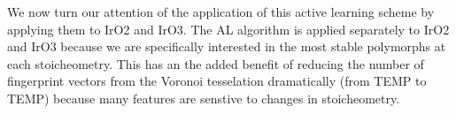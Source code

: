 


%
%
We now turn our attention of the application of this active learning scheme by
applying them to IrO2 and IrO3.
%
The AL algorithm is applied separately to IrO2 and IrO3 because we are specifically interested in the most stable polymorphs at each stoicheometry.
This has an the added benefit of reducing the number of fingerprint vectors from the Voronoi tesselation dramatically (from TEMP to TEMP) because many features are senstive to changes in stoicheometry.

